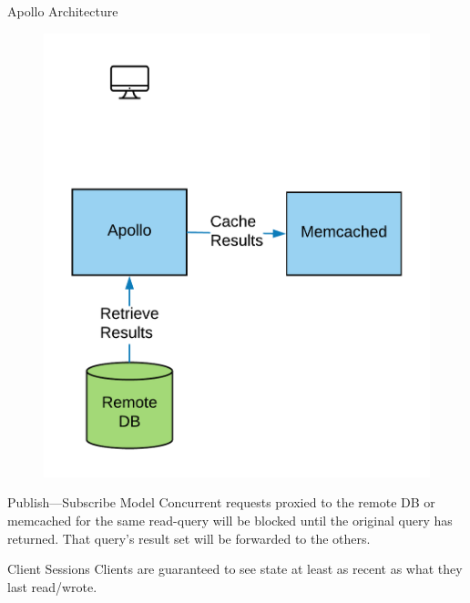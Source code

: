 \documentclass[10pt]{beamer}
\begin{document}
\begin{frame}[fragile]{Apollo Architecture}
    \begin{figure}
        \includegraphics[scale=0.17]{apollo_arch_diagram_8}
    \end{figure}
\end{frame}

\begin{frame}[fragile]{Publish---Subscribe Model}
Concurrent requests proxied to the remote DB or memcached for the same read-query will be blocked until the original query has returned.
That query's result set will be \alert{forwarded} to the others.
\end{frame}

\begin{frame}[fragile]{Client Sessions}
Clients are guaranteed to see state at least as recent as what they last read/wrote.
    \begin{itemize}
    \end{itemize}
\end{frame}
\end{document}
